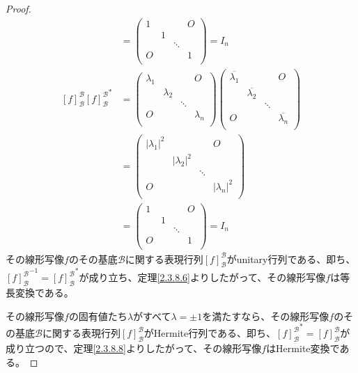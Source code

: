 \documentclass[dvipdfmx]{jsarticle}
\begin{document}
\begin{proof}
\begin{align*}
&= \begin{pmatrix}
1 & \  & \  & O \\
\  & 1 & \  & \  \\
\  & \  & \ddots & \  \\
O & \  & \  & 1 \\
\end{pmatrix} = I_{n}\\
[ f]_{\mathcal{B}}^{\mathcal{B}}{[ f]_{\mathcal{B}}^{\mathcal{B}}}^{*} &= \begin{pmatrix}
\lambda_{1} & \  & \  & O \\
\  & \lambda_{2} & \  & \  \\
\  & \  & \ddots & \  \\
O & \  & \  & \lambda_{n} \\
\end{pmatrix}\begin{pmatrix}
\overline{\lambda_{1}} & \  & \  & O \\
\  & \overline{\lambda_{2}} & \  & \  \\
\  & \  & \ddots & \  \\
O & \  & \  & \overline{\lambda_{n}} \\
\end{pmatrix}\\
&= \begin{pmatrix}
\left| \lambda_{1} \right|^{2} & \  & \  & O \\
\  & \left| \lambda_{2} \right|^{2} & \  & \  \\
\  & \  & \ddots & \  \\
O & \  & \  & \left| \lambda_{n} \right|^{2} \\
\end{pmatrix}\\
&= \begin{pmatrix}
1 & \  & \  & O \\
\  & 1 & \  & \  \\
\  & \  & \ddots & \  \\
O & \  & \  & 1 \\
\end{pmatrix} = I_{n}
\end{align*}
その線形写像$f$のその基底$\mathcal{B}$に関する表現行列$[ f]_{\mathcal{B}}^{\mathcal{B}}$がunitary行列である、即ち、${[ f]_{\mathcal{B}}^{\mathcal{B}}}^{- 1} = {[ f]_{\mathcal{B}}^{\mathcal{B}}}^{*}$が成り立ち、定理\ref{2.3.8.6}よりしたがって、その線形写像$f$は等長変換である。\par
その線形写像$f$の固有値たち$\lambda$がすべて$\lambda = \pm 1$を満たすなら、その線形写像$f$のその基底$\mathcal{B}$に関する表現行列$[ f]_{\mathcal{B}}^{\mathcal{B}}$がHermite行列である、即ち、${[ f]_{\mathcal{B}}^{\mathcal{B}}}^{*} = [ f]_{\mathcal{B}}^{\mathcal{B}}$が成り立つので、定理\ref{2.3.8.8}よりしたがって、その線形写像$f$はHermite変換である。
\end{proof}
\end{document}
